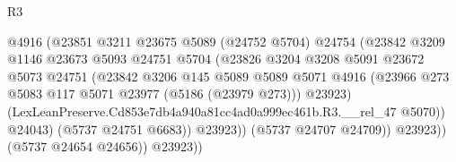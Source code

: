 \begin{lexlean}{R3}
\begin{coremodule}
                                            @4916
                                            (@23851
                                              @3211
                                              @23675
                                              @5089
                                              (@24752 @5704)
                                              @24754
                                              (@23842
                                                @3209
                                                @1146
                                                @23673
                                                @5093
                                                @24751
                                                @5704
                                                (@23826
                                                  @3204
                                                  @3208
                                                  @5091
                                                  @23672
                                                  @5073
                                                  @24751
                                                  (@23842
                                                    @3206
                                                    @145
                                                    @5089
                                                    @5089
                                                    @5071
                                                    @4916
                                                    (@23966
                                                      @273
                                                      @5083
                                                      @117
                                                      @5071
                                                      @23977
                                                      (@5186 (@23979 @273)))
                                                    @23923)
                                                  (LexLeanPreserve.Cd853e7db4a940a81cc4ad0a999ec461b.R3.__rel_47
                                                    @5070))
                                                @24043)
                                              (@5737 @24751 @6683))
                                            @23923))
                                        (@5737 @24707 @24709))
                                      @23923))
                                  (@5737 @24654 @24656))
                                @23923))

\end{coremodule}
\end{lexlean}
